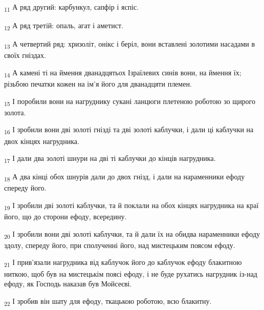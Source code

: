 \begin{tcolorbox}
\textsubscript{11} А ряд другий: карбункул, сапфір і яспіс.
\end{tcolorbox}
\begin{tcolorbox}
\textsubscript{12} А ряд третій: опаль, агат і аметист.
\end{tcolorbox}
\begin{tcolorbox}
\textsubscript{13} А четвертий ряд: хризоліт, онікс і беріл, вони вставлені золотими насадами в своїх гніздах.
\end{tcolorbox}
\begin{tcolorbox}
\textsubscript{14} А камені ті на ймення дванадцятьох Ізраїлевих синів вони, на ймення їх; різьбою печатки кожен на ім'я його для дванадцяти племен.
\end{tcolorbox}
\begin{tcolorbox}
\textsubscript{15} І поробили вони на нагруднику сукані ланцюги плетеною роботою зо щирого золота.
\end{tcolorbox}
\begin{tcolorbox}
\textsubscript{16} І зробили вони дві золоті гнізді та дві золоті каблучки, і дали ці каблучки на двох кінцях нагрудника.
\end{tcolorbox}
\begin{tcolorbox}
\textsubscript{17} І дали два золоті шнури на дві ті каблучки до кінців нагрудника.
\end{tcolorbox}
\begin{tcolorbox}
\textsubscript{18} А два кінці обох шнурів дали до двох гнізд, і дали на нараменники ефоду спереду його.
\end{tcolorbox}
\begin{tcolorbox}
\textsubscript{19} І зробили дві золоті каблучки, та й поклали на обох кінцях нагрудника на краї його, що до сторони ефоду, всередину.
\end{tcolorbox}
\begin{tcolorbox}
\textsubscript{20} І зробили вони дві золоті каблучки, та й дали їх на обидва нараменники ефоду здолу, спереду його, при сполученні його, над мистецьким поясом ефоду.
\end{tcolorbox}
\begin{tcolorbox}
\textsubscript{21} І прив'язали нагрудника від каблучок його до каблучок ефоду блакитною ниткою, щоб був на мистецькім поясі ефоду, і не буде рухатись нагрудник із-над ефоду, як Господь наказав був Мойсеєві.
\end{tcolorbox}
\begin{tcolorbox}
\textsubscript{22} І зробив він шату для ефоду, ткацькою роботою, всю блакитну.
\end{tcolorbox}
